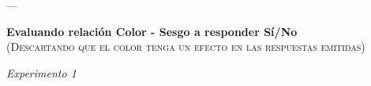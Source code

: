 \documentclass[a4paper ]{article}
\begin{document}
\clearpage

















---
\vspace{3mm}
\begin{center}
{\LARGE \textbf{Evaluando relación Color - Sesgo a responder Sí/No}}\\
{\small \textsc{(Descartando que el color tenga un efecto en las respuestas emitidas)}}\\
\smallskip
\end{center}
\begin{center}
{\LARGE \textit{Experimento 1}}\\
\end{center}
\vspace{3mm}
\end{document}
